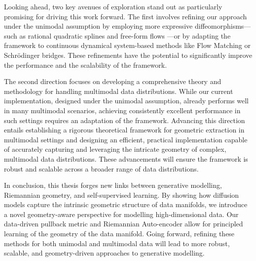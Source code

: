 Looking ahead, two key avenues of exploration stand out as particularly promising for driving this work forward. The first involves refining our approach under the unimodal assumption by employing more expressive diffeomorphisms—such as rational quadratic splines \cite{durkan2019neural} and free-form flows \cite{draxler2024free}—or by adapting the framework to continuous dynamical system-based methods like Flow Matching or Schrödinger bridges. These refinements have the potential to significantly improve the performance and the scalability of the framework.

The second direction focuses on developing a comprehensive theory and methodology for handling multimodal data distributions. While our current implementation, designed under the unimodal assumption, already performs well in many multimodal scenarios, achieving consistently excellent performance in such settings requires an adaptation of the framework. Advancing this direction entails establishing a rigorous theoretical framework for geometric extraction in multimodal settings and designing an efficient, practical implementation capable of accurately capturing and leveraging the intricate geometry of complex, multimodal data distributions. These advancements will ensure the framework is robust and scalable across a broader range of data distributions.

In conclusion, this thesis forges new links between generative modelling, Riemannian geometry, and self-supervised learning. By showing how diffusion models capture the intrinsic geometric structure of data manifolds, we introduce a novel geometry-aware perspective for modelling high-dimensional data. Our data-driven pullback metric and Riemannian Auto-encoder allow for principled learning of the geometry of the data manifold. Going forward, refining these methods for both unimodal and multimodal data will lead to more robust, scalable, and geometry-driven approaches to generative modelling.